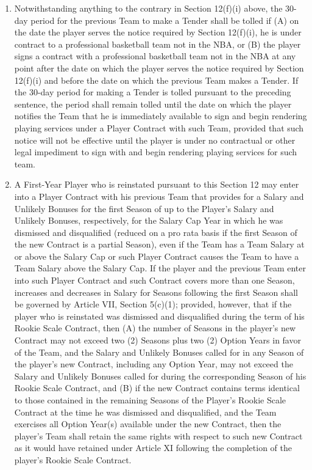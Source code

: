 \documentclass[
]{book}
\begin{document}
\begin{enumerate}
\begin{enumerate}
  \item
    Notwithstanding anything to the contrary in Section 12(f)(i) above, the 30-day period for the previous Team to make a Tender shall be tolled if (A) on the date the player serves the notice required by Section 12(f)(i), he is under contract to a professional basketball team not in the NBA, or (B) the player signs a contract with a professional basketball team not in the NBA at any point after the date on which the player serves the notice required by Section 12(f)(i) and before the date on which the previous Team makes a Tender. If the 30-day period for making a Tender is tolled pursuant to the preceding sentence, the period shall remain tolled until the date on which the player notifies the Team that he is immediately available to sign and begin rendering playing services under a Player Contract with such Team, provided that such notice will not be effective until the player is under no contractual or other legal impediment to sign with and begin rendering playing services for such team.
  \item
    A First-Year Player who is reinstated pursuant to this Section 12 may enter into a Player Contract with his previous Team that provides for a Salary and Unlikely Bonuses for the first Season of up to the Player's Salary and Unlikely Bonuses, respectively, for the Salary Cap Year in which he was dismissed and disqualified (reduced on a pro rata basis if the first Season of the new Contract is a partial Season), even if the Team has a Team Salary at or above the Salary Cap or such Player Contract causes the Team to have a Team Salary above the Salary Cap. If the player and the previous Team enter into such Player Contract and such Contract covers more than one Season, increases and decreases in Salary for Seasons following the first Season shall be governed by Article VII, Section 5(c)(1); provided, however, that if the player who is reinstated was dismissed and disqualified during the term of his Rookie Scale Contract, then (A) the number of Seasons in the player's new Contract may not exceed two (2) Seasons plus two (2) Option Years in favor of the Team, and the Salary and Unlikely Bonuses called for in any Season of the player's new Contract, including any Option Year, may not exceed the Salary and Unlikely Bonuses called for during the corresponding Season of his Rookie Scale Contract, and (B) if the new Contract contains terms identical to those contained in the remaining Seasons of the Player's Rookie Scale Contract at the time he was dismissed and disqualified, and the Team exercises all Option Year(s) available under the new Contract, then the player's Team shall retain the same rights with respect to such new Contract as it would have retained under Article XI following the completion of the player's Rookie Scale Contract.

\end{enumerate}
\end{enumerate}
\end{document}
